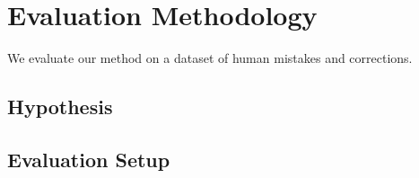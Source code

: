\documentclass[sigplan,screen]{acmart}
\begin{document}
\section{Evaluation Methodology}


We evaluate our method on a dataset of human mistakes and corrections.

\subsection{Hypothesis}


\subsection{Evaluation Setup}




\end{document}
